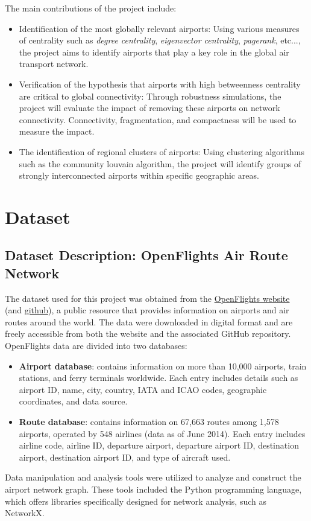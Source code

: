 \documentclass[12pt]{article}
\begin{document}
The main contributions of the project include:

\begin{itemize}
    \item Identification of the most globally relevant airports: Using various measures of centrality such as \textit{degree centrality}, \textit{eigenvector centrality}, \textit{pagerank}, etc..., the project aims to identify airports that play a key role in the global air transport network.
    \item Verification of the hypothesis that airports with high betweenness centrality are critical to global connectivity: Through robustness simulations, the project will evaluate the impact of removing these airports on network connectivity. Connectivity, fragmentation, and compactness will be used to measure the impact.
    \item The identification of regional clusters of airports: Using clustering algorithms such as the community louvain algorithm, the project will identify groups of strongly interconnected airports within specific geographic areas.
\end{itemize}

\section{Dataset}

\subsection{Dataset Description: OpenFlights Air Route Network}
The dataset used for this project was obtained from the \hyperlink{https://openflights.org/}{OpenFlights website} (and \hyperlink{https://github.com/jpatokal/openflights}{github}), a public resource that provides information on airports and air routes around the world. The data were downloaded in digital format and are freely accessible from both the website and the associated GitHub repository.
OpenFlights data are divided into two databases:
\begin{itemize}
    \item \textbf{Airport database}: contains information on more than 10,000 airports, train stations, and ferry terminals worldwide. Each entry includes details such as airport ID, name, city, country, IATA and ICAO codes, geographic coordinates, and data source.
    \item \textbf{Route database}: contains information on 67,663 routes among 1,578 airports, operated by 548 airlines (data as of June 2014). Each entry includes airline code, airline ID, departure airport, departure airport ID, destination airport, destination airport ID, and type of aircraft used.
\end{itemize}
Data manipulation and analysis tools were utilized to analyze and construct the airport network graph. These tools included the Python programming language, which offers libraries specifically designed for network analysis, such as NetworkX.
\end{document}
